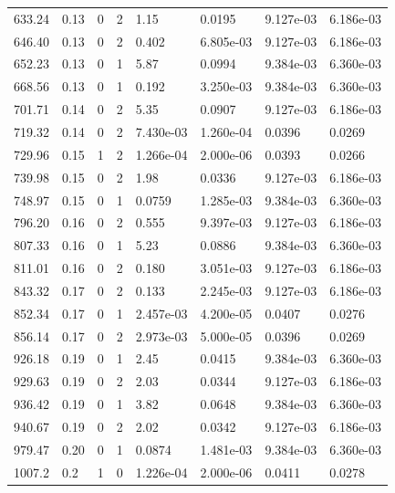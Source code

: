 \documentclass[preview]{standalone}
\begin{document}
{{{\begin{tabular}{L{1.2cm}C{1.2cm} C{0.3cm}C{0.5cm} C{1.4cm}C{1.4cm} C{1.4cm}C{1.4cm}}
  633.24  &  0.13  & 0     &  2 &  1.15  & 0.0195  & 9.127e-03 &  6.186e-03   \\ 
  646.40  &  0.13  & 0     &  2 &  0.402  & 6.805e-03  & 9.127e-03 &  6.186e-03   \\ 
  652.23  &  0.13  & 0     &  1 &  5.87  & 0.0994  & 9.384e-03 &  6.360e-03   \\ 
  668.56  &  0.13  & 0     &  1 &  0.192  & 3.250e-03  & 9.384e-03 &  6.360e-03   \\ 
  701.71  &  0.14  & 0     &  2 &  5.35  & 0.0907  & 9.127e-03 &  6.186e-03   \\ 
  719.32  &  0.14  & 0     &  2 &  7.430e-03  & 1.260e-04  & 0.0396 &  0.0269   \\ 
  729.96  &  0.15  & 1     &  2 &  1.266e-04  & 2.000e-06  & 0.0393 &  0.0266   \\ 
  739.98  &  0.15  & 0     &  2 &  1.98  & 0.0336  & 9.127e-03 &  6.186e-03   \\ 
  748.97  &  0.15  & 0     &  1 &  0.0759  & 1.285e-03  & 9.384e-03 &  6.360e-03   \\ 
  796.20  &  0.16  & 0     &  2 &  0.555  & 9.397e-03  & 9.127e-03 &  6.186e-03   \\ 
  807.33  &  0.16  & 0     &  1 &  5.23  & 0.0886  & 9.384e-03 &  6.360e-03   \\ 
  811.01  &  0.16  & 0     &  2 &  0.180  & 3.051e-03  & 9.127e-03 &  6.186e-03   \\ 
  843.32  &  0.17  & 0     &  2 &  0.133  & 2.245e-03  & 9.127e-03 &  6.186e-03   \\ 
  852.34  &  0.17  & 0     &  1 &  2.457e-03  & 4.200e-05  & 0.0407 &  0.0276   \\ 
  856.14  &  0.17  & 0     &  2 &  2.973e-03  & 5.000e-05  & 0.0396 &  0.0269   \\ 
  926.18  &  0.19  & 0     &  1 &  2.45  & 0.0415  & 9.384e-03 &  6.360e-03   \\ 
  929.63  &  0.19  & 0     &  2 &  2.03  & 0.0344  & 9.127e-03 &  6.186e-03   \\ 
  936.42  &  0.19  & 0     &  1 &  3.82  & 0.0648  & 9.384e-03 &  6.360e-03   \\ 
  940.67  &  0.19  & 0     &  2 &  2.02  & 0.0342  & 9.127e-03 &  6.186e-03   \\ 
  979.47  &  0.20  & 0     &  1 &  0.0874  & 1.481e-03  & 9.384e-03 &  6.360e-03   \\ 
  1007.2  &   0.2  & 1     &  0 &  1.226e-04  & 2.000e-06  & 0.0411 &  0.0278   \\ 

\end{tabular}}}}
\end{document}
